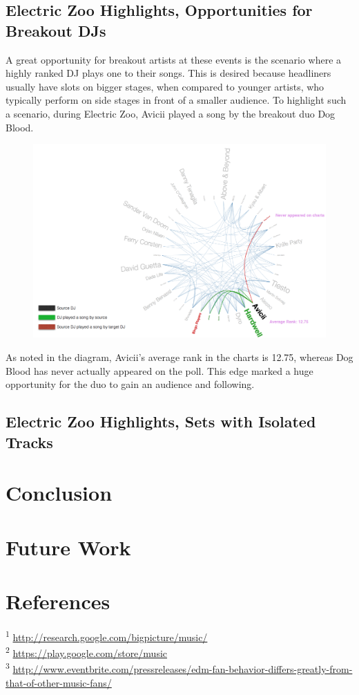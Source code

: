 \documentclass[12pt]{dalcsthesis}
\begin{document}
\section{Electric Zoo Highlights, Opportunities for Breakout DJs}

A great opportunity for breakout artists at these events is the scenario where a highly ranked DJ plays one to their songs. This is desired because headliners usually have slots on bigger stages, when compared to younger artists, who typically perform on side stages in front of a smaller audience. To highlight such a scenario, during Electric Zoo, Avicii played a song by the breakout duo Dog Blood. \newpage

\begin{figure}[h]
\includegraphics[scale=.5]{avicii_dog_blood}
\centering
\end{figure}

As noted in the diagram, Avicii's average rank in the charts is 12.75, whereas Dog Blood has never actually appeared on the poll. This edge marked a huge opportunity for the duo to gain an audience and following.

\section{Electric Zoo Highlights, Sets with Isolated Tracks}



\chapter{Conclusion}
\chapter{Future Work}
\chapter{References}

\textsuperscript{1} \url{http://research.google.com/bigpicture/music/} \\
\textsuperscript{2} \url{https://play.google.com/store/music} \\
\textsuperscript{3} \url{http://www.eventbrite.com/pressreleases/edm-fan-behavior-differs-greatly-from-that-of-other-music-fans/}



\end{document}
